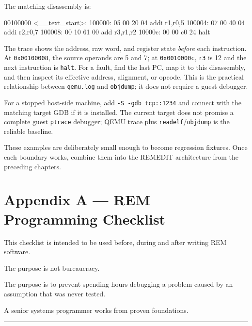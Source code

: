 \documentclass[
  oneside,
  openany]{book}
\newenvironment{Shaded}{\begin{snugshade}}{\end{snugshade}}
\newcommand{\NormalTok}[1]{#1}
\begin{document}
The matching disassembly is:

\begin{Shaded}
\begin{Highlighting}[]
\NormalTok{00100000 \textless{}\_\_text\_start\textgreater{}:}
\NormalTok{  100000: 05 00 20 04  addi r1,r0,5}
\NormalTok{  100004: 07 00 40 04  addi r2,r0,7}
\NormalTok{  100008: 00 10 61 00  add r3,r1,r2}
\NormalTok{  10000c: 00 00 c0 24  halt}
\end{Highlighting}
\end{Shaded}

The trace shows the address, raw word, and register state \emph{before}
each instruction. At \texttt{0x00100008}, the source operands are 5 and
7; at \texttt{0x0010000c}, \texttt{r3} is 12 and the next instruction is
\texttt{halt}. For a fault, find the last PC, map it to this
disassembly, and then inspect its effective address, alignment, or
opcode. This is the practical relationship between \texttt{qemu.log} and
\texttt{objdump}; it does not require a guest debugger.

For a stopped host-side machine, add \texttt{-S\ -gdb\ tcp::1234} and
connect with the matching target GDB if it is installed. The current
target does not promise a complete guest \texttt{ptrace} debugger; QEMU
trace plus \texttt{readelf}/\texttt{objdump} is the reliable baseline.

These examples are deliberately small enough to become regression
fixtures. Once each boundary works, combine them into the REMEDIT
architecture from the preceding chapters.

\hypertarget{appendix-a-rem-programming-checklist}{%
\chapter{Appendix A --- REM Programming
Checklist}\label{appendix-a-rem-programming-checklist}}

This checklist is intended to be used before, during and after writing
REM software.

The purpose is not bureaucracy.

The purpose is to prevent spending hours debugging a problem caused by
an assumption that was never tested.

A senior systems programmer works from proven foundations.

\begin{center}\rule{0.5\linewidth}{0.5pt}\end{center}
\end{document}
